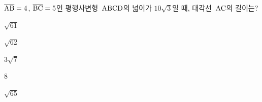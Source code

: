 $\overline{\mathrm{AB}}=4$, $\overline{\mathrm{BC}}=5$인 평행사변형~$\mathrm{ABCD}$의 넓이가 $10\sqrt{3}$일 때, 대각선~$\mathrm{AC}$의 길이는? 
\begin{choices32}{\rule[-3ex]{0pt}{8ex}$\sqrt{61}$}{\rule[-3ex]{0pt}{8ex}$\sqrt{62}$}{\rule[-3ex]{0pt}{8ex}$3\sqrt{7}$}{\rule[-3ex]{0pt}{8ex}$8$}{\rule[-3ex]{0pt}{8ex}$\sqrt{65}$}\end{choices32}
